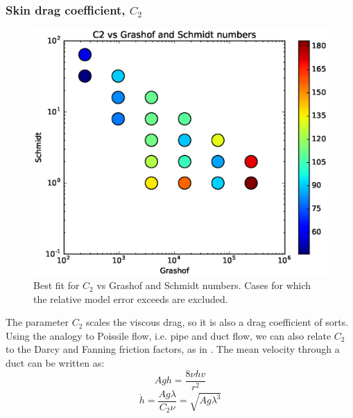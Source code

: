 \subsubsection{Skin drag coefficient, $C_2$}
\begin{figure}
\includegraphics[width=\columnwidth]{figs/C2-vs-Grashof-Schmidt}
\caption{ 
  Best fit for $C_2$ vs Grashof and Schmidt numbers.
  Cases for which the relative model error exceeds \fittol are excluded.
}
\end{figure}

The parameter $C_2$ scales the viscous drag, so it is also a drag coefficient of sorts.
Using the analogy to Poissile flow, i.e. pipe and duct flow, we can also relate $C_2$ to the Darcy and Fanning friction factors, as in .
The mean velocity through a duct can be written as:
\begin{equation}
A g h = \frac{8 \nu h v}{r^2}
\end{equation}
\begin{equation}
\dot{h} = \frac{A g \lambda}{C_2 \nu} = \sqrt{A g \lambda^3 }
\end{equation}

